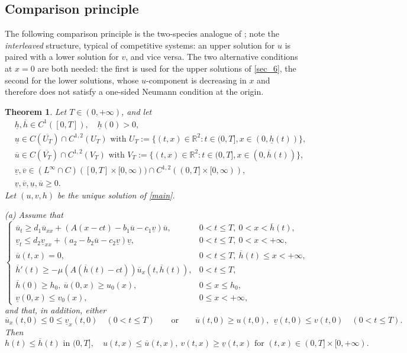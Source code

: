 \documentclass[reqno]{amsart}
\theoremstyle{plain}
\newtheorem{theorem}{Theorem}
\theoremstyle{definition}
\theoremstyle{remark}
\begin{document}
\subsection{Comparison principle}

The following comparison principle is the two-species analogue of
\cite[Lemma 2.6]{MR3327894}; note the \emph{interleaved} structure, typical of
competitive systems: an upper solution for $u$ is paired with a lower solution
for $v$, and vice versa. The two alternative conditions at $x=0$ are both needed:
the first is used for the upper solutions of \cref{sec_6}, the second for the
lower solutions, whose $u$-component is decreasing in $x$ and therefore does not
satisfy a one-sided Neumann condition at the origin.

\begin{theorem}\label{th7}
	Let $T \in (0,+\infty)$, and let
	\begin{align*}
		&\underline{h}, \overline{h} \in C^1([0,T]),\quad \underline h(0)>0,\\
		&\underline{u} \in C(\overline{U_T}) \cap C^{1,2}(U_T) \text{ with } U_T := \{ (t,x) \in \mathbb{R}^2 : t \in (0, T], x \in (0, \underline{h}(t))\},\\
		&\overline{u} \in C(\overline{V_T}) \cap C^{1,2}(V_T) \text{ with } V_T := \{ (t,x) \in \mathbb{R}^2 : t \in (0, T], x \in (0, \overline{h}(t))\},\\
		&\underline{v}, \overline{v} \in (L^{\infty} \cap C)([0,T] \times [0,\infty)) \cap C^{1,2}((0,T] \times [0,\infty)),\\
		&\underline{v}, \overline{v}, \underline{u}, \overline{u} \ge 0 .
	\end{align*}
	Let $(u,v,h)$ be the unique solution of \eqref{main}.

	\emph{(a)} Assume that
	\[
	\begin{cases}
		\overline{u}_t \ge d_1\overline{u}_{xx} + (A(x - ct) - b_1\overline{u} - c_1 \underline{v}) \overline{u}, & 0 < t \le T,~ 0 < x < \overline{h}(t), \\
		\underline{v}_t \le d_2\underline{v}_{xx} + (a_2 - b_2\overline{u} - c_2\underline{v})\underline{v}, & 0 < t \le T,~ 0 < x < +\infty, \\
		\overline{u}(t, x) = 0, & 0 < t \le T, ~ \overline{h}(t) \leq x < +\infty, \\
		\overline{h}'(t) \ge -\mu (A(\overline{h}(t) - ct))\overline{u}_x(t, \overline{h}(t)), & 0 < t \le T, \\
		\overline{h}(0) \ge h_0,~ \overline{u}(0, x) \ge u_0(x), & 0 \leq x \leq h_0, \\
		\underline{v}(0, x) \le v_0(x), & 0 \le x < +\infty,
	\end{cases}
	\]
	and that, in addition, either
	\[
	\overline{u}_x(t, 0) \le 0 \le \underline{v}_x(t, 0)\quad (0<t\le T)
	\qquad\text{or}\qquad
	\overline{u}(t,0)\ge u(t,0),\ \ \underline v(t,0)\le v(t,0)\quad (0<t\le T).
	\]
	Then
	\[
	h(t) \le \overline{h}(t) \text{ in } (0,T],\quad u(t,x) \le \overline{u} (t,x), ~ v(t,x) \ge \underline{v} (t,x) \text{ for } (t,x) \in (0,T] \times [0,+\infty).
	\]


\end{theorem}
\end{document}
